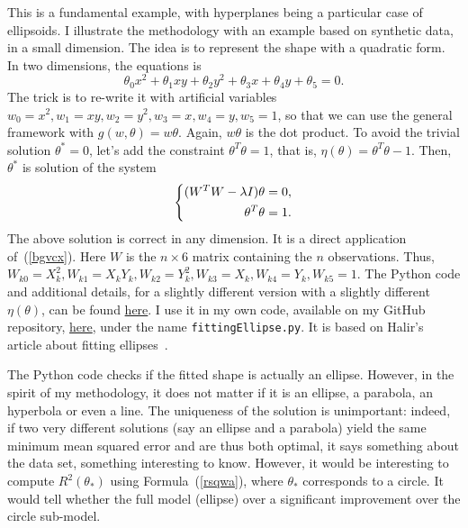 \documentclass[oneside,10pt]{book}
\begin{document}
This is a fundamental example, with hyperplanes being a particular case of ellipsoids. I illustrate the methodology with an example based on synthetic data, in a small dimension. The idea is to represent the shape with a quadratic form. In two dimensions, the equations is 
$$
\theta_0 x^2 + \theta_1 xy + \theta_2 y^2 + \theta_3 x + \theta_4 y + \theta_5=0.
$$
The trick is to re-write it with artificial variables $w_0=x^2, w_1=xy,w_2=y^2, w_3=x,w_4=y,w_5=1$, so that we can use the general framework
 with $g(w,\theta)=w\theta$. Again, $w\theta$ is the dot product. To avoid the trivial solution $\theta^*=0$, let's add the constraint
 $\theta^T\theta=1$, that is, $\eta(\theta)=\theta^T\theta-1$. Then, $\theta^*$ is solution of  the system
\begin{equation}
\centering
\left\{\begin{split}
( W^TW -\lambda I)\theta & =0, \\
 \theta^T\theta & =1. \\
\end{split}\right. \label{bgvcx2} %
\end{equation}
The above solution is correct in any dimension. It is a direct application of~(\ref{bgvcx}). Here $W$ is the $n \times 6$ matrix containing the $n$ observations. Thus, $W_{k0}=X_k^2, W_{k1}=X_kY_k, W_{k2}=Y_k^2,  W_{k3}=X_k, W_{k4}=Y_k, W_{k5}=1$. The Python code and additional details, for a slightly different version with a slightly different $\eta(\theta)$, can be found \href{https://scipython.com/blog/direct-linear-least-squares-fitting-of-an-ellipse/}{here}. I use it in my own code, available on my GitHub repository, \href{https://github.com/VincentGranville/Machine-Learning/blob/main/Source\%20Code/fittingEllipse.py}{here}, under the name \texttt{fittingEllipse.py}.  It is based on Halir's article about fitting ellipses~\cite{Halir98numericallystable}.

The Python code checks if the fitted shape is actually an ellipse. However, in the spirit of my methodology, it does not matter if it is an ellipse, a parabola, an hyperbola or even a line. The uniqueness of the solution is unimportant: indeed, if two very different solutions (say an ellipse and a 
 parabola) yield the same minimum mean squared error and are thus both optimal, it says something about the data set, 
 something interesting to know.   However, it would be interesting to compute $R^2(\theta_*)$ using
 Formula~(\ref{rsqwa}), where $\theta_*$ corresponds to a circle. It would tell
 whether the full model (ellipse) over a significant improvement over the circle sub-model.
\end{document}
